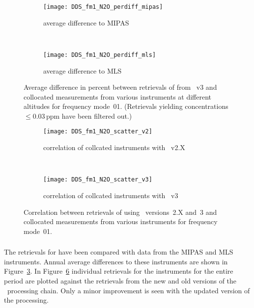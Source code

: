 \begin{figure}[htpb]
    \centering
    \begin{subfigure}[b]{0.49\textwidth}
        \texttt{[image: DDS\_fm1\_N2O\_perdiff\_mipas]}
        \caption{average difference to MIPAS}
        \label{fig:fm01:N2O:profiles:MIPAS}
    \end{subfigure}
    \,
    \begin{subfigure}[b]{0.49\textwidth}
        \texttt{[image: DDS\_fm1\_N2O\_perdiff\_mls]}
        \caption{average difference to MLS}
        \label{fig:fm01:N2O:profiles:MLS}
    \end{subfigure}
    \caption{Average difference in percent between retrievals of 
    from \smr~v3 and collocated measurements from various instruments at
    different altitudes for frequency mode~01. (Retrievals yielding
    concentrations $\leq 0.03\,\mathrm{ppm}$ have been filtered out.)}
    \label{fig:fm01:N2O:profiles}
\end{figure}

\begin{figure}[htpb]
    \centering
    \begin{subfigure}[b]{0.49\textwidth}
        \texttt{[image: DDS\_fm1\_N2O\_scatter\_v2]}
        \caption{correlation of collcated instruments with \smr~v2.X}
        \label{fig:fm01:N2O:scatter:v2}
    \end{subfigure}
    \,
    \begin{subfigure}[b]{0.49\textwidth}
        \texttt{[image: DDS\_fm1\_N2O\_scatter\_v3]}
        \caption{correlation of collcated instruments with \smr~v3}
        \label{fig:fm01:N2O:scatter:v3}
    \end{subfigure}
    \caption{Correlation between retrievals of  using \smr\
    versions~2.X and~3 and collocated measurements from various instruments
    for frequency mode~01.}
    \label{fig:fm01:N2O:scatter}
\end{figure}

\subsubsection{}
\label{sec:fm01:comparison:N2O}
The retrievals for \chem{N_2O} have been compared with data from the MIPAS and
MLS instruments. Annual average differences to these instruments are shown in
Figure~\ref{fig:fm01:N2O:profiles}. In Figure~\ref{fig:fm01:N2O:scatter}
individual retrievals for the instruments for the entire period are plotted
against the retrievals from the new and old versions of the \smr\ processing
chain. Only a minor improvement is seen with the updated version of the
processing.



